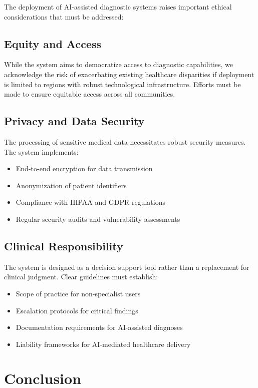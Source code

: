 \documentclass[conference]{IEEEtran}
\begin{document}
The deployment of AI-assisted diagnostic systems raises important ethical considerations that must be addressed:

\subsection{Equity and Access}

While the system aims to democratize access to diagnostic capabilities, we acknowledge the risk of exacerbating existing healthcare disparities if deployment is limited to regions with robust technological infrastructure. Efforts must be made to ensure equitable access across all communities.

\subsection{Privacy and Data Security}

The processing of sensitive medical data necessitates robust security measures. The system implements:
\begin{itemize}
\item End-to-end encryption for data transmission
\item Anonymization of patient identifiers
\item Compliance with HIPAA and GDPR regulations
\item Regular security audits and vulnerability assessments
\end{itemize}

\subsection{Clinical Responsibility}

The system is designed as a decision support tool rather than a replacement for clinical judgment. Clear guidelines must establish:
\begin{itemize}
\item Scope of practice for non-specialist users
\item Escalation protocols for critical findings
\item Documentation requirements for AI-assisted diagnoses
\item Liability frameworks for AI-mediated healthcare delivery
\end{itemize}

\section{Conclusion}
\end{document}
